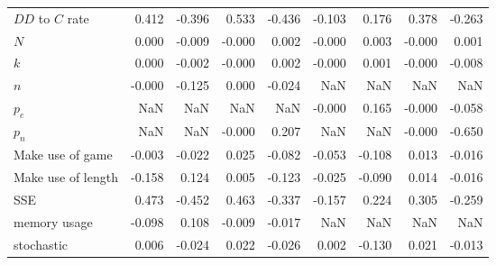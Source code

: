 \begin{tabular}{lrrrrrrrr}
$DD$ to $C$ rate     &            0.412 &        -0.396 &            0.533 &        -0.436 &           -0.103 &         0.176 &            0.378 &        -0.263 \\
$N$                  &            0.000 &        -0.009 &           -0.000 &         0.002 &           -0.000 &         0.003 &           -0.000 &         0.001 \\
$k$                  &            0.000 &        -0.002 &           -0.000 &         0.002 &           -0.000 &         0.001 &           -0.000 &        -0.008 \\
$n$                  &           -0.000 &        -0.125 &            0.000 &        -0.024 &              NaN &           NaN &              NaN &           NaN \\
$p_e$                &              NaN &           NaN &              NaN &           NaN &           -0.000 &         0.165 &           -0.000 &        -0.058 \\
$p_n$                &              NaN &           NaN &           -0.000 &         0.207 &              NaN &           NaN &           -0.000 &        -0.650 \\
Make use of game     &           -0.003 &        -0.022 &            0.025 &        -0.082 &           -0.053 &        -0.108 &            0.013 &        -0.016 \\
Make use of length   &           -0.158 &         0.124 &            0.005 &        -0.123 &           -0.025 &        -0.090 &            0.014 &        -0.016 \\
SSE                  &            0.473 &        -0.452 &            0.463 &        -0.337 &           -0.157 &         0.224 &            0.305 &        -0.259 \\
memory usage         &           -0.098 &         0.108 &           -0.009 &        -0.017 &              NaN &           NaN &              NaN &           NaN \\
stochastic           &            0.006 &        -0.024 &            0.022 &        -0.026 &            0.002 &        -0.130 &            0.021 &        -0.013 \\
\bottomrule
\end{tabular}
